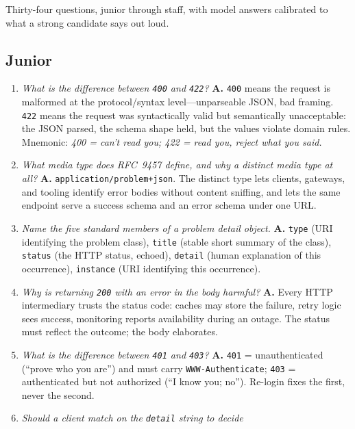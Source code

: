 Thirty-four questions, junior through staff, with model answers calibrated to
what a strong candidate says out loud.

\subsection*{Junior}

\begin{enumerate}[label=\textbf{Q\arabic*.}, leftmargin=3.2em]
  \item \emph{What is the difference between \texttt{400} and \texttt{422}?}
        \textbf{A.} \texttt{400} means the request is malformed at the
        protocol/syntax level---unparseable JSON, bad framing. \texttt{422}
        means the request was syntactically valid but semantically
        unacceptable: the JSON parsed, the schema shape held, but the values
        violate domain rules. Mnemonic: \emph{400 = can't read you; 422 =
        read you, reject what you said.}
  \item \emph{What media type does RFC~9457 define, and why a distinct media
        type at all?} \textbf{A.} \texttt{application/problem+json}. The
        distinct type lets clients, gateways, and tooling identify error
        bodies without content sniffing, and lets the same endpoint serve a
        success schema and an error schema under one URL.
  \item \emph{Name the five standard members of a problem detail object.}
        \textbf{A.} \texttt{type} (URI identifying the problem class),
        \texttt{title} (stable short summary of the class), \texttt{status}
        (the HTTP status, echoed), \texttt{detail} (human explanation of
        this occurrence), \texttt{instance} (URI identifying this
        occurrence).
  \item \emph{Why is returning \texttt{200} with an error in the body
        harmful?} \textbf{A.} Every HTTP intermediary trusts the status
        code: caches may store the failure, retry logic sees success,
        monitoring reports availability during an outage. The status must
        reflect the outcome; the body elaborates.
  \item \emph{What is the difference between \texttt{401} and \texttt{403}?}
        \textbf{A.} \texttt{401} = unauthenticated (``prove who you are'')
        and must carry \texttt{WWW-Authenticate}; \texttt{403} =
        authenticated but not authorized (``I know you; no''). Re-login
        fixes the first, never the second.
  \item \emph{Should a client match on the \texttt{detail} string to decide
}
\end{enumerate}
